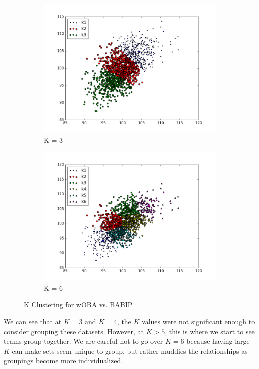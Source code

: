 \documentclass[12pt]{article}
\numberwithin{equation}{subsection}
\begin{document}
\begin{figure}[H]
\begin{subfigure}[b]{0.5\linewidth}
    \includegraphics[width=0.9\linewidth]{KCluster3} 
    \caption{K = 3} 
    \label{fig5:c} 
  \end{subfigure}%
  \begin{subfigure}[b]{0.5\linewidth}
    \centering
    \includegraphics[width=0.9\linewidth]{KCluster4} 
    \caption{K = 6} 
    \label{fig5:d} 
  \end{subfigure} 
  \caption{K Clustering for wOBA vs. BABIP}
  \label{fig5} 
\end{figure}

We can see that at $K=3$ and $K=4$, the $K$ values were not significant enough to consider grouping these datasets. However, at $K>5$, this is where we start to see teams group together. We are careful not to go over $K=6$ because having large $K$ can make sets seem unique to group, but rather muddies the relationships as groupings become more individualized.
\end{document}
